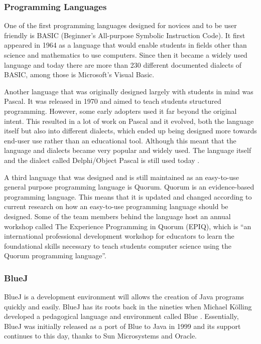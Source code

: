 \subsubsection{Programming Languages}
One of the first programming languages designed for novices and to be user friendly is BASIC (Beginner's All-purpose Symbolic Instruction Code). It first appeared in 1964 as a language that would enable students in fields other than science and mathematics to use computers. Since then it became a widely used language and today there are more than 230 different documented dialects of BASIC, among those is Microsoft's Visual Basic.

Another language that was originally designed largely with students in mind was Pascal. It was released in 1970 and aimed to teach students structured programming. However, some early adopters used it far beyond the original intent. This resulted in a lot of work on Pascal and it evolved, both the language itself but also into different dialects, which ended up being designed more towards end-user use rather than an educational tool. Although this meant that the language and dialects became very popular and widely used. The language itself and the dialect called Delphi/Object Pascal is still used today \cite{tiobe}.

A third language that was designed and is still maintained as an easy-to-use general purpose programming language is Quorum. Quorum is an evidence-based programming language. This means that it is updated and changed according to current research on how an easy-to-use programming language should be designed. Some of the team members behind the language host an annual workshop called The Experience Programming in Quorum (EPIQ), which is ``an international professional development workshop for educators to learn the foundational skills necessary to teach students computer science using the Quorum programming language''\cite{quorum_epiq}.

\subsubsection{BlueJ}
BlueJ is a development environment will allows the creation of Java programs quickly and easily. BlueJ has its roots back in the nineties when Michael Kölling developed a pedagogical language and environment called Blue \cite{bluej_overview}. Essentially, BlueJ was initially released as a port of Blue to Java in 1999 and its support continues to this day, thanks to Sun Microsystems and Oracle.

